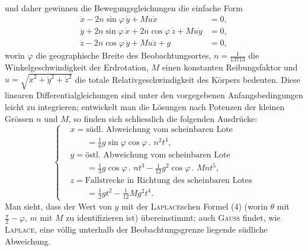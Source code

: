 und daher gewinnen die Bewegungsgleichungen die einfache Form
\[
\begin{aligned}
\ddot x-2n\sin\varphi\,\dot y+Mu\dot x&=0,\\
\ddot y+2n\sin\varphi\,\dot x+2n\cos\varphi\,\dot z+Mu\dot y&=0,\\
\ddot z-2n\cos\varphi\,\dot y+Mu\dot z+g&=0,
\end{aligned}\tag{7}
\]
\noindent worin $\varphi$ die geographische Breite des Beobachtungsortes, $n=\frac{1}{13713}$ die Winkelgeschwindigkeit
der Erdrotation, $M$ einen konstanten Reibungsfaktor und
$u=\sqrt{\dot x^{2}+\dot y^{2}+\dot z^{2}}$ die totale Relativgeschwindigkeit des Körpers bedeuten. Diese
linearen Differentialgleichungen sind unter den vorgegebenen Anfangsbedingungen
leicht zu integrieren; entwickelt man die Lösungen nach Potenzen
der kleinen Grössen $n$ und $M$, so finden sich schliesslich die folgenden Ausdrücke:
\clearpage{}
\[
\left\{\begin{aligned}
&x=\text{südl. Abweichung vom scheinbaren Lote}\\[-2pt]
&\hspace{2em}=\tfrac16 g\sin\varphi\cos\varphi\mathpunct{.}\,n^{2}t^{4},\\
&y=\text{östl. Abweichung vom scheinbaren Lote}\\[-2pt]
&\hspace{2em}=\tfrac13 g\cos\varphi\mathpunct{.}\,nt^{3}-\tfrac1{12}g^{2}\cos\varphi\mathpunct{.}\,Mnt^{5},\\
&z=\text{Fallstrecke in Richtung des scheinbaren Lotes}\\[-2pt]
&\hspace{2em}=\tfrac12 gt^{2}-\tfrac1{12}Mg^{2}t^{4}.
\end{aligned}\right.\tag{8}
\]
\noindent Man sieht, dass der Wert von $y$ mit der \textsc{Laplace}schen Formel (4) (worin $\theta$
mit $\frac\pi2-\varphi$, $m$ mit $M$ zu identifizieren ist) übereinstimmt; auch \textsc{Gauss} findet,
wie \textsc{Laplace}, eine völlig unterhalb der Beobachtungsgrenze liegende südliche
Abweichung.

